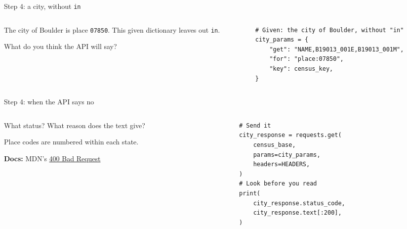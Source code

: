\documentclass[9pt,aspectratio=169]{beamer}
\begin{document}
\begin{frame}[fragile]{Step 4: a city, without \texttt{in}}
    \begin{columns}[T]
        \begin{column}{0.37\textwidth}
            The city of Boulder is place \texttt{07850}. This given dictionary leaves out \texttt{in}.

            \medskip
            What do you think the API will say?
        \end{column}
        \begin{column}{0.6\textwidth}
\begin{lstlisting}
# Given: the city of Boulder, without "in"
city_params = {
    "get": "NAME,B19013_001E,B19013_001M",
    "for": "place:07850",
    "key": census_key,
}
\end{lstlisting}
        \end{column}
    \end{columns}
\end{frame}

\begin{frame}[fragile]{Step 4: when the API says no}
    \begin{columns}[T]
        \begin{column}{0.37\textwidth}
            What status? What reason does the text give?

            \medskip
            Place codes are numbered within each state.

            \medskip
            {\scriptsize\textbf{Docs:} MDN's \href{https://developer.mozilla.org/en-US/docs/Web/HTTP/Reference/Status/400}{400 Bad Request}\par}
        \end{column}
        \begin{column}{0.6\textwidth}
\begin{lstlisting}
# Send it
city_response = requests.get(
    census_base,
    params=city_params,
    headers=HEADERS,
)
# Look before you read
print(
    city_response.status_code,
    city_response.text[:200],
)
\end{lstlisting}
        \end{column}
    \end{columns}
\end{frame}
\end{document}
